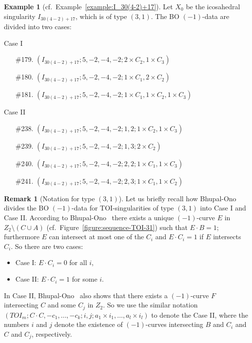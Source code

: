 \documentclass[reqno, twoside, a4paper]{amsart}
\theoremstyle{definition}
\newtheorem{remark}[theorem]{Remark}
\newtheorem{example}[theorem]{Example}
\numberwithin{equation}{section}
\begin{document}
\begin{example}[cf.~Example~\ref{example:I_30(4-2)+17}]
Let $X_0$ be the icosahedral singularity $I_{30(4-2)+17}$, which is of type $(3,1)$. The BO $(-1)$-data are divided into two cases:

Case I

\begin{enumerate}
\item[\#179.] $(I_{30(4-2)+17}; 5,-2,-4,-2; 2 \times C_2, 1 \times C_3)$
\item[\#180.] $(I_{30(4-2)+17}; 5,-2,-4,-2; 1 \times C_1, 2 \times C_2)$
\item[\#181.] $(I_{30(4-2)+17}; 5,-2,-4,-2; 1 \times C_1, 1 \times C_2, 1 \times C_3)$
\end{enumerate}

Case II

\begin{enumerate}
\item[\#238.] $(I_{30(4-2)+17}; 5,-2,-4,-2; 1, 2; 1 \times C_2, 1 \times C_3)$
\item[\#239.] $(I_{30(4-2)+17}; 5,-2,-4,-2; 1, 3; 2 \times C_2)$
\item[\#240.] $(I_{30(4-2)+17}; 5,-2,-4,-2; 2, 2; 1 \times C_1, 1 \times C_3)$
\item[\#241.] $(I_{30(4-2)+17}; 5,-2,-4,-2; 2, 3; 1 \times C_1, 1 \times C_2)$
\end{enumerate}
\end{example}

\begin{remark}[Notation for type $(3,1)$]
\label{remark:CaseI-vs-CaseII}
Let us briefly recall how Bhupal-Ono~\cite{Bhupal-Ono-2012} divides the BO $(-1)$-data for TOI-singularities of type $(3,1)$ into Case I and Case II. According to Bhupal-Ono~\cite[Lemma~4.6]{Bhupal-Ono-2012} there exists a unique $(-1)$-curve $E$ in $Z_2 \setminus (C \cup A)$ (cf.~Figure~\ref{figure:sequence-TOI-31}) such that $E \cdot B = 1$; furthermore $E$ can intersect at most one of the $C_i$ and $E \cdot C_i = 1$ if $E$ intersects $C_i$. So there are two cases:
%
\begin{itemize}
\item Case I: $E \cdot C_i=0$ for all $i$,

\item Case II: $E \cdot C_i = 1$ for some $i$.
\end{itemize}
%
In Case II, Bhupal-Ono~\cite[Lemma~4.9]{Bhupal-Ono-2012} also shows that there exists a $(-1)$-curve $F$ intersecting $C$ and some $C_j$ in $Z_2$. So we use the similar notation $(TOI_m; C \cdot C, -c_1, \dotsc ,-c_k; i, j; a_1 \times i_1, \dotsc , a_l \times i_l)$ to denote the Case II, where the numbers $i$ and $j$ denote the existence of $(-1)$-curves intersecting $B$ and $C_i$ and $C$ and $C_j$, respectively.
\end{remark}
\end{document}

